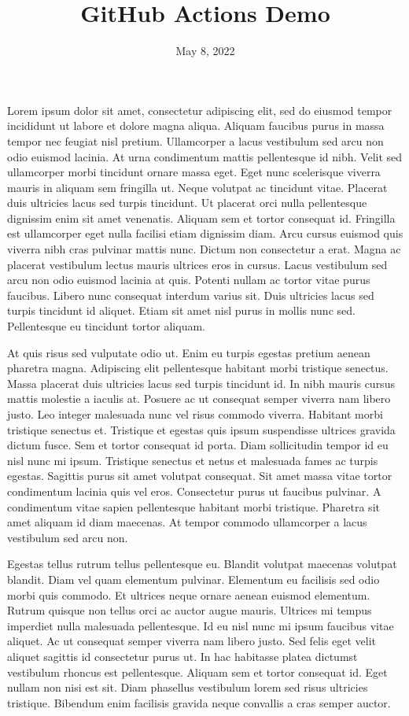 \documentclass{article}
\title{GitHub Actions Demo}
\author{}
\date{May 8, 2022}
\begin{document}
\maketitle

Lorem ipsum dolor sit amet, consectetur adipiscing elit, sed do eiusmod tempor incididunt ut labore et dolore magna aliqua. Aliquam faucibus purus in massa tempor nec feugiat nisl pretium. Ullamcorper a lacus vestibulum sed arcu non odio euismod lacinia. At urna condimentum mattis pellentesque id nibh. Velit sed ullamcorper morbi tincidunt ornare massa eget. Eget nunc scelerisque viverra mauris in aliquam sem fringilla ut. Neque volutpat ac tincidunt vitae. Placerat duis ultricies lacus sed turpis tincidunt. Ut placerat orci nulla pellentesque dignissim enim sit amet venenatis. Aliquam sem et tortor consequat id. Fringilla est ullamcorper eget nulla facilisi etiam dignissim diam. Arcu cursus euismod quis viverra nibh cras pulvinar mattis nunc. Dictum non consectetur a erat. Magna ac placerat vestibulum lectus mauris ultrices eros in cursus. Lacus vestibulum sed arcu non odio euismod lacinia at quis. Potenti nullam ac tortor vitae purus faucibus. Libero nunc consequat interdum varius sit. Duis ultricies lacus sed turpis tincidunt id aliquet. Etiam sit amet nisl purus in mollis nunc sed. Pellentesque eu tincidunt tortor aliquam.


At quis risus sed vulputate odio ut. Enim eu turpis egestas pretium aenean pharetra magna. Adipiscing elit pellentesque habitant morbi tristique senectus. Massa placerat duis ultricies lacus sed turpis tincidunt id. In nibh mauris cursus mattis molestie a iaculis at. Posuere ac ut consequat semper viverra nam libero justo. Leo integer malesuada nunc vel risus commodo viverra. Habitant morbi tristique senectus et. Tristique et egestas quis ipsum suspendisse ultrices gravida dictum fusce. Sem et tortor consequat id porta. Diam sollicitudin tempor id eu nisl nunc mi ipsum. Tristique senectus et netus et malesuada fames ac turpis egestas. Sagittis purus sit amet volutpat consequat. Sit amet massa vitae tortor condimentum lacinia quis vel eros. Consectetur purus ut faucibus pulvinar. A condimentum vitae sapien pellentesque habitant morbi tristique. Pharetra sit amet aliquam id diam maecenas. At tempor commodo ullamcorper a lacus vestibulum sed arcu non.

Egestas tellus rutrum tellus pellentesque eu. Blandit volutpat maecenas volutpat blandit. Diam vel quam elementum pulvinar. Elementum eu facilisis sed odio morbi quis commodo. Et ultrices neque ornare aenean euismod elementum. Rutrum quisque non tellus orci ac auctor augue mauris. Ultrices mi tempus imperdiet nulla malesuada pellentesque. Id eu nisl nunc mi ipsum faucibus vitae aliquet. Ac ut consequat semper viverra nam libero justo. Sed felis eget velit aliquet sagittis id consectetur purus ut. In hac habitasse platea dictumst vestibulum rhoncus est pellentesque. Aliquam sem et tortor consequat id. Eget nullam non nisi est sit. Diam phasellus vestibulum lorem sed risus ultricies tristique. Bibendum enim facilisis gravida neque convallis a cras semper auctor.
\end{document}
